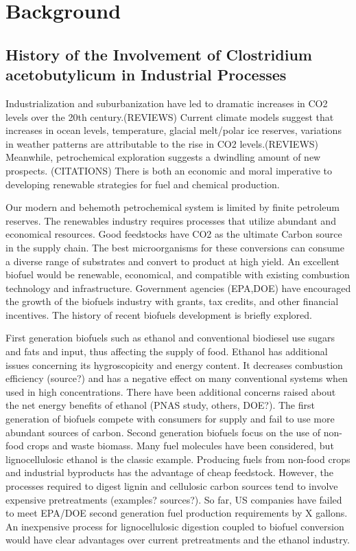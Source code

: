 
\chapter{Background}

\section{History of the Involvement of Clostridium acetobutylicum in Industrial Processes}
Industrialization and suburbanization have led to dramatic increases in CO2 levels over the 20th century.(REVIEWS) Current climate models suggest that increases in ocean levels, temperature, glacial melt/polar ice reserves, variations in weather patterns are attributable to the rise in CO2 levels.(REVIEWS) Meanwhile, petrochemical exploration suggests a dwindling amount of new prospects. (CITATIONS) There is both an economic and moral imperative to developing renewable strategies for fuel and chemical production.

Our modern and behemoth petrochemical system is limited by finite petroleum reserves. The renewables industry requires processes that utilize abundant and economical resources. Good feedstocks have CO2 as the ultimate Carbon source in the supply chain. The best microorganisms for these conversions can consume a diverse range of substrates and convert to product at high yield. An excellent biofuel would be renewable, economical, and compatible with existing combustion technology and infrastructure. Government agencies (EPA,DOE) have encouraged the growth of the biofuels industry with grants, tax credits, and other financial incentives. The history of recent biofuels development is briefly explored.

First generation biofuels such as ethanol and conventional biodiesel use sugars and fats and input, thus affecting the supply of food. Ethanol has additional issues concerning its hygroscopicity and energy content. It decreases combustion efficiency (source?) and has a negative effect on many conventional systems when used in high concentrations. There have been additional concerns raised about the net energy benefits of ethanol (PNAS study, others, DOE?). The first generation of biofuels compete with consumers for supply and fail to use more abundant sources of carbon.
Second generation biofuels focus on the use of non-food crops and waste biomass. Many fuel molecules have been considered, but lignocellulosic ethanol is the classic example. Producing fuels from non-food crops and industrial byproducts has the advantage of cheap feedstock. However, the processes required to digest lignin and cellulosic carbon sources tend to involve expensive pretreatments (examples? sources?). So far, US companies have failed to meet EPA/DOE second generation fuel production requirements by X gallons. An inexpensive process for lignocellulosic digestion coupled to biofuel conversion would have clear advantages over current pretreatments and the ethanol industry.


